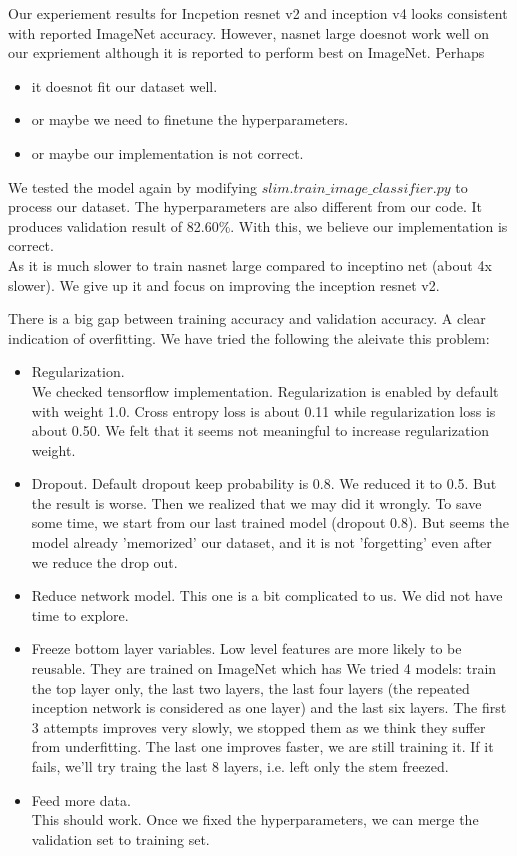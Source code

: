\documentclass[11pt]{article} %
\begin{document}
Our experiement results for Incpetion resnet v2 and inception v4 looks consistent with reported ImageNet accuracy. However, nasnet large doesnot work well on our expriement although it is reported to perform best on ImageNet.
Perhaps 
\begin{itemize}
	\item it doesnot fit our dataset well.
	\item or maybe we need to finetune the hyperparameters.
	\item or maybe our implementation is not correct.
\end{itemize}
We tested the model again by modifying $slim.train\_image\_classifier.py$ to process our dataset. The hyperparameters are also different from our code. It produces validation result of 82.60\%. With this, we believe our implementation is correct.\\
As it is much slower to train nasnet large compared to inceptino net (about 4x slower). We give up it and focus on improving the inception resnet v2.

There is a big gap between training accuracy and validation accuracy. A clear indication of overfitting. We have tried the following the aleivate this problem:
\begin{itemize}
	\item Regularization.\\
	We checked tensorflow implementation. Regularization is enabled by default with weight 1.0. Cross entropy loss is about 0.11 while regularization loss is about 0.50. We felt that it seems not meaningful to increase regularization weight.
	\item Dropout.
	Default dropout keep probability is 0.8. We reduced it to 0.5. But the result is worse. Then we realized that we may did it wrongly. To save some time, we start from our last trained model (dropout 0.8). But seems the model already 'memorized' our dataset, and it is not 'forgetting' even after we reduce the drop out.
	\item Reduce network model.
	This one is a bit complicated to us. We did not have time to explore.
	\item Freeze bottom layer variables.
	Low level features are more likely to be reusable. They are trained on ImageNet which has 
	We tried 4 models: train the top layer only, the last two layers, the last four layers (the repeated inception network is considered as one layer) and the last six layers. The first 3 attempts improves very slowly, we stopped them as we think they suffer from underfitting. The last one improves faster, we are still training it. If it fails, we'll try traing the last 8 layers, i.e. left only the stem freezed.
	\item Feed more data.\\
	This should work. Once we fixed the hyperparameters, we can merge the validation set to training set.
\end{itemize}
\end{document}
